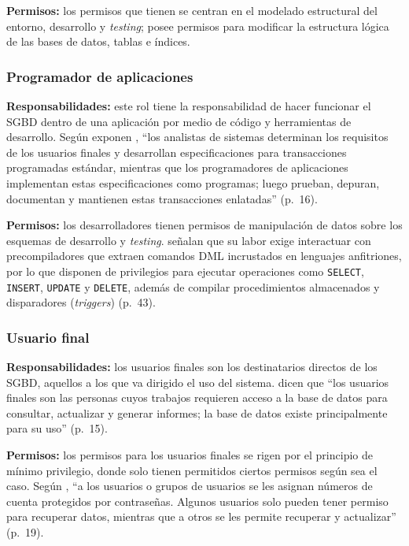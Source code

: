 \textbf{Permisos:} los permisos que tienen se centran en el modelado estructural del entorno, desarrollo y \textit{testing}; posee permisos para modificar la estructura lógica de las bases de datos, tablas e índices.

\subsubsection{Programador de aplicaciones}

\textbf{Responsabilidades:} este rol tiene la responsabilidad de hacer funcionar el SGBD dentro de una aplicación por medio de código y herramientas de desarrollo. Según exponen \textcite{elmasri_navathe}, \enquote{los analistas de sistemas determinan los requisitos de los usuarios finales y desarrollan especificaciones para transacciones programadas estándar, mientras que los programadores de aplicaciones implementan estas especificaciones como programas; luego prueban, depuran, documentan y mantienen estas transacciones enlatadas} (p.~16).

\textbf{Permisos:} los desarrolladores tienen permisos de manipulación de datos sobre los esquemas de desarrollo y \textit{testing}. \textcite{elmasri_navathe} señalan que su labor exige interactuar con precompiladores que extraen comandos DML incrustados en lenguajes anfitriones, por lo que disponen de privilegios para ejecutar operaciones como \texttt{SELECT}, \texttt{INSERT}, \texttt{UPDATE} y \texttt{DELETE}, además de compilar procedimientos almacenados y disparadores (\textit{triggers}) (p.~43).

\subsubsection{Usuario final}

\textbf{Responsabilidades:} los usuarios finales son los destinatarios directos de los SGBD, aquellos a los que va dirigido el uso del sistema. \textcite{elmasri_navathe} dicen que \enquote{los usuarios finales son las personas cuyos trabajos requieren acceso a la base de datos para consultar, actualizar y generar informes; la base de datos existe principalmente para su uso} (p.~15).

\textbf{Permisos:} los permisos para los usuarios finales se rigen por el principio de mínimo privilegio, donde solo tienen permitidos ciertos permisos según sea el caso. Según \textcite{elmasri_navathe}, \enquote{a los usuarios o grupos de usuarios se les asignan números de cuenta protegidos por contraseñas. Algunos usuarios solo pueden tener permiso para recuperar datos, mientras que a otros se les permite recuperar y actualizar} (p.~19).

